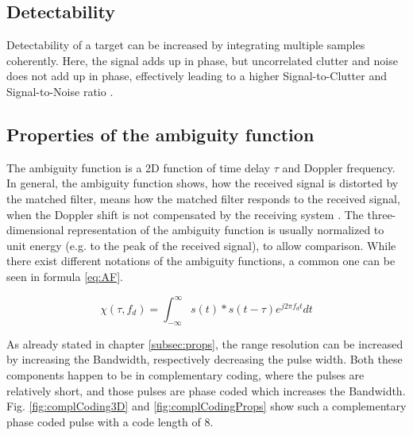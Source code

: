 \subsection{Detectability}
Detectability of a target can be increased by integrating multiple samples coherently. Here, the signal adds up in phase, but uncorrelated clutter and noise does not add up in phase, effectively leading to a higher Signal-to-Clutter and Signal-to-Noise ratio \citep{richards2010principles}.

\subsection{Properties of the ambiguity function}
The ambiguity function is a 2D function of time delay $\tau$ and Doppler frequency. In general, the ambiguity function shows, how the received signal is distorted by the matched filter, means how the matched filter responds to the received signal, when the Doppler shift is not compensated by the receiving system \citep{richards2010principles}. The three-dimensional representation of the ambiguity function is usually normalized to unit energy (e.g. to the peak of the received signal), to allow comparison. While there exist different notations of the ambiguity functions, a common one can be seen in formula \ref{eq:AF}.

\begin{equation}
	\chi(\tau,f_d) = \int_{-\infty}^\infty s(t)*s(t-\tau)e^{j2\pi f_dt}dt
	\label{eq:AF}
\end{equation}

As already stated in chapter \ref{subsec:props}, the range resolution can be increased by increasing the Bandwidth, respectively decreasing the pulse width. Both these components happen to be in complementary coding, where the pulses are relatively short, and those pulses are phase coded which increases the Bandwidth. Fig. \ref{fig:complCoding3D} and \ref{fig:complCodingProps} show such a complementary phase coded pulse with a code length of 8.

